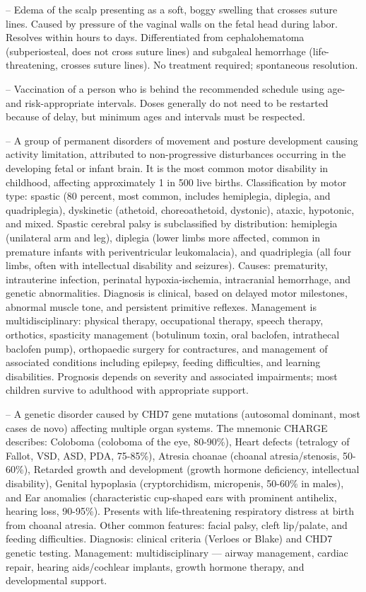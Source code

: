 -- Edema of the scalp presenting as a soft, boggy swelling that crosses suture lines. Caused by pressure of the vaginal walls on the fetal head during labor. Resolves within hours to days. Differentiated from cephalohematoma (subperiosteal, does not cross suture lines) and subgaleal hemorrhage (life-threatening, crosses suture lines). No treatment required; spontaneous resolution.

-- Vaccination of a person who is behind the recommended schedule using age- and risk-appropriate intervals. Doses generally do not need to be restarted because of delay, but minimum ages and intervals must be respected.

-- A group of permanent disorders of movement and posture development causing activity limitation, attributed to non-progressive disturbances occurring in the developing fetal or infant brain. It is the most common motor disability in childhood, affecting approximately 1 in 500 live births. Classification by motor type: spastic (80 percent, most common, includes hemiplegia, diplegia, and quadriplegia), dyskinetic (athetoid, choreoathetoid, dystonic), ataxic, hypotonic, and mixed. Spastic cerebral palsy is subclassified by distribution: hemiplegia (unilateral arm and leg), diplegia (lower limbs more affected, common in premature infants with periventricular leukomalacia), and quadriplegia (all four limbs, often with intellectual disability and seizures). Causes: prematurity, intrauterine infection, perinatal hypoxia-ischemia, intracranial hemorrhage, and genetic abnormalities. Diagnosis is clinical, based on delayed motor milestones, abnormal muscle tone, and persistent primitive reflexes. Management is multidisciplinary: physical therapy, occupational therapy, speech therapy, orthotics, spasticity management (botulinum toxin, oral baclofen, intrathecal baclofen pump), orthopaedic surgery for contractures, and management of associated conditions including epilepsy, feeding difficulties, and learning disabilities. Prognosis depends on severity and associated impairments; most children survive to adulthood with appropriate support.

-- A genetic disorder caused by CHD7 gene mutations (autosomal dominant, most cases de novo) affecting multiple organ systems. The mnemonic CHARGE describes: Coloboma (coloboma of the eye, 80-90\%), Heart defects (tetralogy of Fallot, VSD, ASD, PDA, 75-85\%), Atresia choanae (choanal atresia/stenosis, 50-60\%), Retarded growth and development (growth hormone deficiency, intellectual disability), Genital hypoplasia (cryptorchidism, micropenis, 50-60\% in males), and Ear anomalies (characteristic cup-shaped ears with prominent antihelix, hearing loss, 90-95\%). Presents with life-threatening respiratory distress at birth from choanal atresia. Other common features: facial palsy, cleft lip/palate, and feeding difficulties. Diagnosis: clinical criteria (Verloes or Blake) and CHD7 genetic testing. Management: multidisciplinary — airway management, cardiac repair, hearing aids/cochlear implants, growth hormone therapy, and developmental support.

